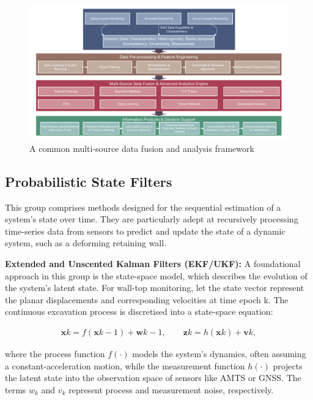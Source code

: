 \documentclass[preprint,11pt,authoryear,3p]{elsarticle}
\begin{document}
\begin{figure}[h]
    \centering 
    \includegraphics[width=\textwidth]{imgs/IntegratedAnalysis.pdf}
    \caption{A common multi-source data fusion and analysis framework}
    \label{fig:DataFusionFramework}
\end{figure}

\subsection{Probabilistic State Filters}

This group comprises methods designed for the sequential estimation of a system's state over time. They are particularly adept at recursively processing time-series data from sensors to predict and update the state of a dynamic system, such as a deforming retaining wall.

\textbf{Extended and Unscented Kalman Filters (EKF/UKF):} A foundational approach in this group is the state-space model, which describes the evolution of the system's latent state. For wall-top monitoring, let the state vector  represent the planar displacements and corresponding velocities at time epoch k. The continuous excavation process is discretised into a state-space equation:

\begin{align}
\mathbf{x}{k}=f(\mathbf{x}{k-1})+\mathbf{w}{k-1},
\qquad
\mathbf{z}{k}=h(\mathbf{x}{k})+\mathbf{v}{k},
\end{align}

where the process function $f(\cdot)$ models the system's dynamics, often assuming a constant-acceleration motion, while the measurement function $h(\cdot)$ projects the latent state into the observation space of sensors like AMTS or GNSS. The terms $w_k$ and $v_k$ represent process and measurement noise, respectively.
\end{document}

